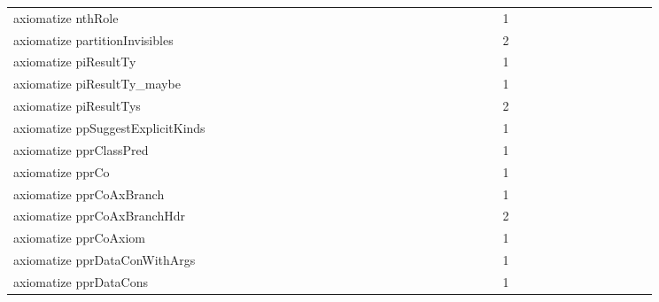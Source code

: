 {\begin{tabular}{l|rrr|rrr|rrr}
axiomatize nthRole &  &  &  &  &  &  &  &  &  &  &  &  &  &  &  &  &  &  &  &  &  &  &  & 1 &  &  &  &  &  &  &  &  &  &  &  & \\
axiomatize partitionInvisibles &  &  &  &  &  &  &  &  &  &  &  &  &  &  &  &  &  &  &  &  &  &  &  & 2 &  &  &  &  &  &  &  &  &  &  &  & \\
axiomatize piResultTy &  &  &  &  &  &  &  &  &  &  &  &  &  &  &  &  &  &  &  &  &  &  &  & 1 &  &  &  &  &  &  &  &  &  &  &  & \\
axiomatize piResultTy_maybe &  &  &  &  &  &  &  &  &  &  &  &  &  &  &  &  &  &  &  &  &  &  &  & 1 &  &  &  &  &  &  &  &  &  &  &  & \\
axiomatize piResultTys &  &  &  &  &  &  &  &  &  &  &  &  &  &  &  &  &  &  &  &  &  &  &  & 2 &  &  &  &  &  &  &  &  &  &  &  & \\
axiomatize ppSuggestExplicitKinds &  &  &  &  &  &  &  &  &  &  &  &  &  &  &  &  &  &  &  &  &  &  &  & 1 &  &  &  &  &  &  &  &  &  &  &  & \\
axiomatize pprClassPred &  &  &  &  &  &  &  &  &  &  &  &  &  &  &  &  &  &  &  &  &  &  &  & 1 &  &  &  &  &  &  &  &  &  &  &  & \\
axiomatize pprCo &  &  &  &  &  &  &  &  &  &  &  &  &  &  &  &  &  &  &  &  &  &  &  & 1 &  &  &  &  &  &  &  &  &  &  &  & \\
axiomatize pprCoAxBranch &  &  &  &  &  &  &  &  &  &  &  &  &  &  &  &  &  &  &  &  &  &  &  & 1 &  &  &  &  &  &  &  &  &  &  &  & \\
axiomatize pprCoAxBranchHdr &  &  &  &  &  &  &  &  &  &  &  &  &  &  &  &  &  &  &  &  &  &  &  & 2 &  &  &  &  &  &  &  &  &  &  &  & \\
axiomatize pprCoAxiom &  &  &  &  &  &  &  &  &  &  &  &  &  &  &  &  &  &  &  &  &  &  &  & 1 &  &  &  &  &  &  &  &  &  &  &  & \\
axiomatize pprDataConWithArgs &  &  &  &  &  &  &  &  &  &  &  &  &  &  &  &  &  &  &  &  &  &  &  & 1 &  &  &  &  &  &  &  &  &  &  &  & \\
axiomatize pprDataCons &  &  &  &  &  &  &  &  &  &  &  &  &  &  &  &  &  &  &  &  &  &  &  & 1 &  &  &  &  &  &  &  &  &  &  &  & \\

\end{tabular}}

